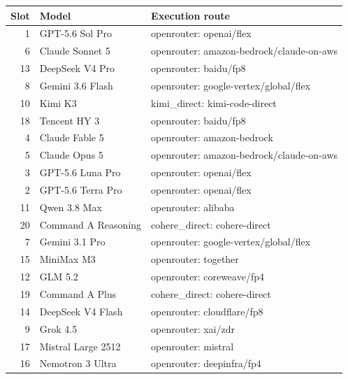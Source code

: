 \begin{tabular}{@{}r l l@{}}
\toprule
Slot & Model & Execution route \\
\midrule
1 & GPT-5.6 Sol Pro & openrouter: openai/flex \\
6 & Claude Sonnet 5 & openrouter: amazon-bedrock/claude-on-aws \\
13 & DeepSeek V4 Pro & openrouter: baidu/fp8 \\
8 & Gemini 3.6 Flash & openrouter: google-vertex/global/flex \\
10 & Kimi K3 & kimi\_direct: kimi-code-direct \\
18 & Tencent HY 3 & openrouter: baidu/fp8 \\
4 & Claude Fable 5 & openrouter: amazon-bedrock \\
5 & Claude Opus 5 & openrouter: amazon-bedrock/claude-on-aws \\
3 & GPT-5.6 Luna Pro & openrouter: openai/flex \\
2 & GPT-5.6 Terra Pro & openrouter: openai/flex \\
11 & Qwen 3.8 Max & openrouter: alibaba \\
20 & Command A Reasoning & cohere\_direct: cohere-direct \\
7 & Gemini 3.1 Pro & openrouter: google-vertex/global/flex \\
15 & MiniMax M3 & openrouter: together \\
12 & GLM 5.2 & openrouter: coreweave/fp4 \\
19 & Command A Plus & cohere\_direct: cohere-direct \\
14 & DeepSeek V4 Flash & openrouter: cloudflare/fp8 \\
9 & Grok 4.5 & openrouter: xai/zdr \\
17 & Mistral Large 2512 & openrouter: mistral \\
16 & Nemotron 3 Ultra & openrouter: deepinfra/fp4 \\
\bottomrule
\end{tabular}
